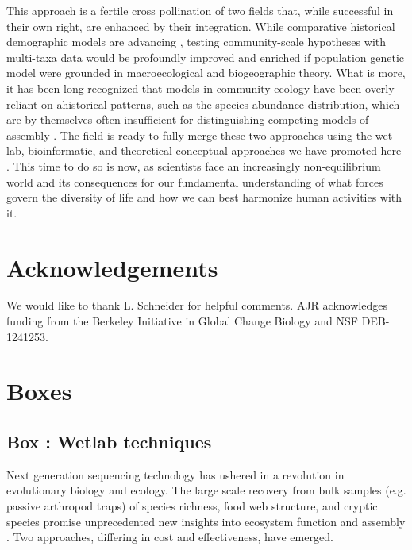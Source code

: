 \documentclass[12pt]{article}
\newcounter{Box}
\begin{document}
This approach is a fertile cross pollination of two fields that, while
successful in their own right, are enhanced by their
integration. While comparative historical demographic models are
advancing \citep{Xue2015-el, Hickerson2006-uf, Carstens2016-mc,
  Chan2014-nq, Satler2016-lb}, testing community-scale hypotheses with
multi-taxa data would be profoundly improved and enriched if
population genetic model were grounded in macroecological and
biogeographic theory.  What is more, it has been long recognized that
models in community ecology have been overly reliant on ahistorical
patterns, such as the species abundance distribution, which are by
themselves often insufficient for distinguishing competing models of
assembly \citep{McGill2007-hx}.  The field is ready to
fully merge these two approaches using the wet lab, bioinformatic, and
theoretical-conceptual approaches we have promoted here . This time to do so is now, 
% 
% 
% 
 as scientists face an increasingly
non-equilibrium world and its consequences for our fundamental
understanding of what forces govern the diversity of life and how we
can best harmonize human activities with it.

\section*{Acknowledgements}

We would like to thank L. Schneider for helpful comments. AJR
acknowledges funding from the Berkeley Initiative in Global Change
Biology and NSF DEB-1241253.

\pagebreak




\pagebreak

\section*{Boxes}


\label{box:wet}
\subsection*{Box \theBox: Wetlab techniques}
    
Next generation sequencing technology has ushered in a revolution in
evolutionary biology and ecology. The large scale recovery from bulk
samples (e.g. passive arthropod traps) of species richness, food web
structure, and cryptic species promise unprecedented new insights into
ecosystem function and assembly \citep{krehenwinkel2016,
  shokralla2015, gibson2014, taberlet2012}.  Two approaches, differing
in cost and effectiveness, have emerged.
\end{document}

